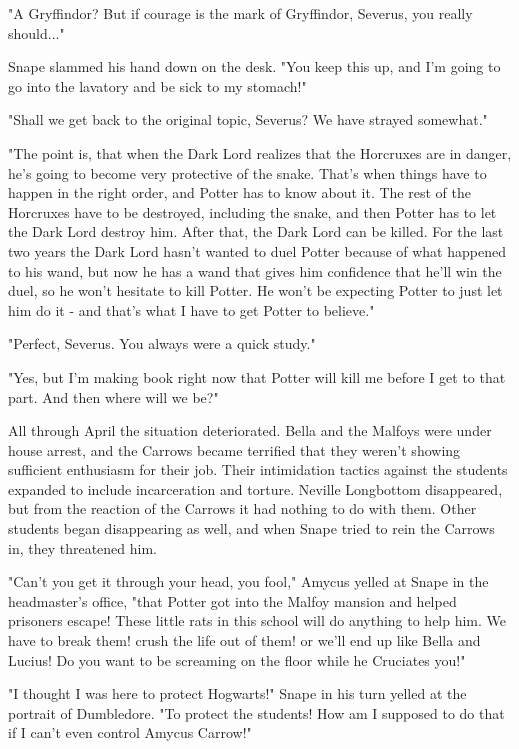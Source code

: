 "A Gryffindor? But if courage is the mark of Gryffindor, Severus, you really should..."

Snape slammed his hand down on the desk. "You keep this up, and I'm going to go into the lavatory and be sick to my stomach!"

"Shall we get back to the original topic, Severus? We have strayed somewhat."

"The point is, that when the Dark Lord realizes that the Horcruxes are in danger, he's going to become very protective of the snake. That's when things have to happen in the right order, and Potter has to know about it. The rest of the Horcruxes have to be destroyed, including the snake, and then Potter has to let the Dark Lord destroy him. After that, the Dark Lord can be killed. For the last two years the Dark Lord hasn't wanted to duel Potter because of what happened to his wand, but now he has a wand that gives him confidence that he'll win the duel, so he won't hesitate to kill Potter. He won't be expecting Potter to just let him do it - and that's what I have to get Potter to believe."

"Perfect, Severus. You always were a quick study."

"Yes, but I'm making book right now that Potter will kill me before I get to that part. And then where will we be?"

All through April the situation deteriorated. Bella and the Malfoys were under house arrest, and the Carrows became terrified that they weren't showing sufficient enthusiasm for their job. Their intimidation tactics against the students expanded to include incarceration and torture. Neville Longbottom disappeared, but from the reaction of the Carrows it had nothing to do with them. Other students began disappearing as well, and when Snape tried to rein the Carrows in, they threatened him.

"Can't you get it through your head, you fool," Amycus yelled at Snape in the headmaster's office, "that Potter got into the Malfoy mansion and helped prisoners escape! These little rats in this school will do anything to help him. We have to break them! crush the life out of them! or we'll end up like Bella and Lucius! Do you want to be screaming on the floor while he Cruciates you!"

"I thought I was here to protect Hogwarts!" Snape in his turn yelled at the portrait of Dumbledore. "To protect the students! How am I supposed to do that if I can't even control Amycus Carrow!"

